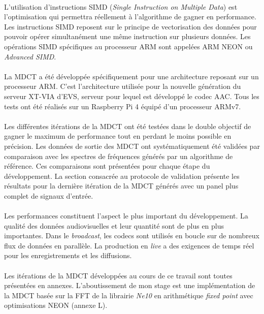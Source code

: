 \documentclass{article}
\begin{document}
    \paragraph{}
    L'utilisation d'instructions SIMD (\emph{Single Instruction on Multiple Data}) est l'optimisation qui permettra réellement à l'algorithme de gagner en performance. Les instructions SIMD reposent sur le principe de vectorisation des données pour pouvoir opérer simultanément une même instruction sur plusieurs données. Les opérations SIMD spécifiques au processeur ARM sont appelées ARM NEON ou \emph{Advanced SIMD}.

    \paragraph{}
    La MDCT a été développée spécifiquement pour une architecture reposant sur un processeur ARM. C'est l'architecture utilisée pour la nouvelle génération du serveur XT-VIA d'EVS, serveur pour lequel est développé le codec AAC. Tous les tests ont été réalisés sur un Raspberry Pi 4 équipé d'un processeur ARMv7.

    \paragraph{}
    Les différentes itérations de la MDCT ont été testées dans le double objectif de gagner le maximum de performance tout en perdant le moins possible en précision. Les données de sortie des MDCT ont systématiquement été validées par comparaison avec les spectres de fréquences générés par un algorithme de référence. Ces comparaisons sont présentées pour chaque étape du développement. La section consacrée au protocole de validation présente les résultats pour la dernière itération de la MDCT générés avec un panel plus complet de signaux d'entrée.

    \paragraph{}
    Les performances constituent l'aspect le plus important du développement. La qualité des données audiovisuelles et leur quantité sont de plus en plus importantes. Dans le \emph{broadcast}, les codecs sont utilisés en boucle sur de nombreux flux de données en parallèle. La production en \emph{live} a des exigences de temps réel pour les enregistrements et les diffusions.

    \paragraph{}
    Les itérations de la MDCT développées au cours de ce travail sont toutes présentées en annexes. L'aboutissement de mon stage est une implémentation de la MDCT basée sur la FFT de la librairie \emph{Ne10} en arithmétique \emph{fixed point} avec optimisations NEON (annexe L).
\end{document}

